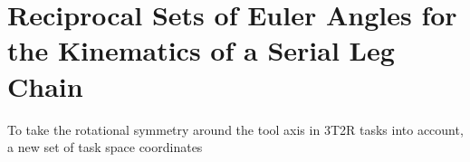 \documentclass[robotics,article,accept,moreauthors,pdftex]{Definitions/mdpi}
\begin{document}

\section{Reciprocal Sets of Euler Angles for the Kinematics of a Serial Leg Chain}
\label{sec:REW_seriell}


To take the rotational symmetry around the tool axis in 3T2R tasks into account, a new set of task space coordinates
\vspace{-0.5cm} %
\end{document}
